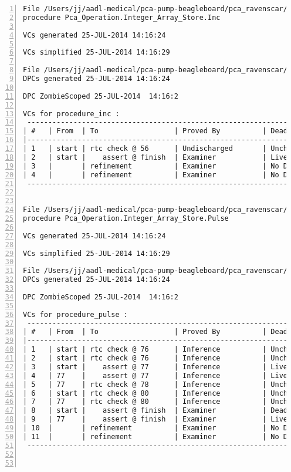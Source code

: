 \begin{lstlisting}[gobble=0, numbers=left, caption={POGS report for PCA Pump prototype}, label={listing:pca_ravenscar:pogs_full}]
File /Users/jj/aadl-medical/pca-pump-beagleboard/pca_ravenscar/pca_operation/integer_array_store/inc.vcg
procedure Pca_Operation.Integer_Array_Store.Inc

VCs generated 25-JUL-2014 14:16:24

VCs simplified 25-JUL-2014 14:16:29

File /Users/jj/aadl-medical/pca-pump-beagleboard/pca_ravenscar/pca_operation/integer_array_store/inc.dpc
DPCs generated 25-JUL-2014 14:16:24

DPC ZombieScoped 25-JUL-2014  14:16:2

VCs for procedure_inc :
 -----------------------------------------------------------------------------
| #   | From  | To                  | Proved By          | Dead Path | Status |
|-----------------------------------------------------------------------------
| 1   | start | rtc check @ 56      | Undischarged       | Unchecked |   UU   |
| 2   | start |    assert @ finish  | Examiner           | Live      |   EL   |
| 3   |       | refinement          | Examiner           | No DPC    |   E-   |
| 4   |       | refinement          | Examiner           | No DPC    |   E-   |
 -----------------------------------------------------------------------------


File /Users/jj/aadl-medical/pca-pump-beagleboard/pca_ravenscar/pca_operation/integer_array_store/pulse.vcg
procedure Pca_Operation.Integer_Array_Store.Pulse

VCs generated 25-JUL-2014 14:16:24

VCs simplified 25-JUL-2014 14:16:29

File /Users/jj/aadl-medical/pca-pump-beagleboard/pca_ravenscar/pca_operation/integer_array_store/pulse.dpc
DPCs generated 25-JUL-2014 14:16:24

DPC ZombieScoped 25-JUL-2014  14:16:2

VCs for procedure_pulse :
 -----------------------------------------------------------------------------
| #   | From  | To                  | Proved By          | Dead Path | Status |
|-----------------------------------------------------------------------------
| 1   | start | rtc check @ 76      | Inference          | Unchecked |   IU   |
| 2   | start | rtc check @ 76      | Inference          | Unchecked |   IU   |
| 3   | start |    assert @ 77      | Inference          | Live      |   IL   |
| 4   | 77    |    assert @ 77      | Inference          | Live      |   IL   |
| 5   | 77    | rtc check @ 78      | Inference          | Unchecked |   IU   |
| 6   | start | rtc check @ 80      | Inference          | Unchecked |   IU   |
| 7   | 77    | rtc check @ 80      | Inference          | Unchecked |   IU   |
| 8   | start |    assert @ finish  | Examiner           | Dead      |   ED   |
| 9   | 77    |    assert @ finish  | Examiner           | Live      |   EL   |
| 10  |       | refinement          | Examiner           | No DPC    |   E-   |
| 11  |       | refinement          | Examiner           | No DPC    |   E-   |
 -----------------------------------------------------------------------------



\end{lstlisting}
